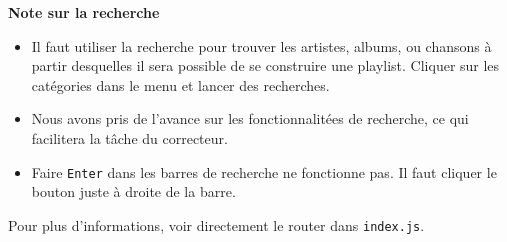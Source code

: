 \documentclass[12pt]{/home/samuel/Documents/GLO/latex/documentClass/GLO_ULAVAL}
\begin{document}
\begin{center}
  \begin{minipage}{0.8\linewidth}
    \textbf{Note sur la recherche}
    \begin{itemize}
      \item Il faut utiliser la recherche pour trouver les artistes, albums, ou chansons à partir desquelles il sera possible de se construire une playlist. Cliquer sur les catégories dans le menu et lancer des recherches.
      \item Nous avons pris de l'avance sur les fonctionnalitées de recherche, ce qui facilitera la tâche du correcteur.
      \item Faire \texttt{Enter} dans les barres de recherche ne fonctionne pas. Il faut cliquer le bouton juste à droite de la barre.
    \end{itemize}
  \end{minipage}
\end{center}

Pour plus d'informations, voir directement le router dans \texttt{index.js}.
\end{document}
